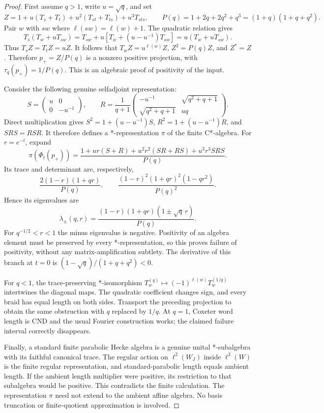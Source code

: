 \documentclass[11pt]{article}
\theoremstyle{remark}\newtheorem{remark}[definition]{Remark}
\begin{document}
\begin{proof}
First assume $q>1$, write $u=\sqrt q$, and set
\[
 Z=1+u(T_s+T_t)+u^2(T_{st}+T_{ts})+u^3T_{sts},\qquad
 P(q)=1+2q+2q^2+q^3=(1+q)(1+q+q^2).
\]
Pair $w$ with $sw$ where $\ell(sw)=\ell(w)+1$. The quadratic relation gives
\[
 T_s(T_w+uT_{sw})
 =T_{sw}+u[T_w+(u-u^{-1})T_{sw}]
 =u(T_w+uT_{sw}).
\]
Thus $T_s Z=T_t Z=uZ$. It follows that
$T_wZ=u^{\ell(w)}Z$, $Z^2=P(q)Z$, and $Z^*=Z$.
Therefore $p_+=Z/P(q)$ is a nonzero positive projection, with
$\tau_q(p_+)=1/P(q)$. This is an algebraic proof of positivity of the input.

Consider the following genuine selfadjoint representation:
\[
 S=\begin{pmatrix}u&0\\0&-u^{-1}\end{pmatrix},\qquad
 R=\frac1{q+1}
 \begin{pmatrix}-u^{-1}&\sqrt{q^2+q+1}\\
 \sqrt{q^2+q+1}&uq\end{pmatrix}.
\]
Direct multiplication gives
$S^2=1+(u-u^{-1})S$, $R^2=1+(u-u^{-1})R$, and $SRS=RSR$.
It therefore defines a *-representation $\pi$ of the finite C*-algebra.
For $r=e^{-t}$, expand
\[
 \pi(\Phi_t(p_+))=
 \frac{1+ur(S+R)+u^2r^2(SR+RS)+u^3r^3SRS}{P(q)}.
\]
Its trace and determinant are, respectively,
\[
 \frac{2(1-r)(1+qr)}{P(q)},\qquad
 \frac{(1-r)^2(1+qr)^2(1-qr^2)}{P(q)^2}.
\]
Hence its eigenvalues are
\begin{equation}\label{eq:bad-eigenvalues}
 \lambda_\pm(q,r)=\frac{(1-r)(1+qr)(1\pm\sqrt q\,r)}{P(q)}.
\end{equation}
For $q^{-1/2}<r<1$ the minus eigenvalue is negative. Positivity of an
algebra element must be preserved by every *-representation, so this
proves failure of positivity, without any matrix-amplification subtlety.
The derivative of this branch at $t=0$ is
$(1-\sqrt q)/(1+q+q^2)<0$.

For $q<1$, the trace-preserving *-isomorphism
$T_w^{(q)}\mapsto(-1)^{\ell(w)}T_w^{(1/q)}$ intertwines the diagonal
maps. The quadratic coefficient changes sign, and every braid has equal
length on both sides. Transport the preceding projection to obtain the
same obstruction with $q$ replaced by $1/q$.
At $q=1$, Coxeter word length is CND and the usual Fourier construction
works; the claimed failure interval correctly disappears.

Finally, a standard finite parabolic Hecke algebra is a genuine unital
*-subalgebra with its faithful canonical trace. The regular action on
$\ell^2(W_J)$ inside $\ell^2(W)$ is the finite regular representation,
and standard-parabolic length equals ambient length. If the ambient
length multiplier were positive, its restriction to that subalgebra would
be positive. This contradicts the finite calculation. The representation
$\pi$ need not extend to the ambient affine algebra. No basis truncation
or finite-quotient approximation is involved.
\end{proof}
\end{document}
